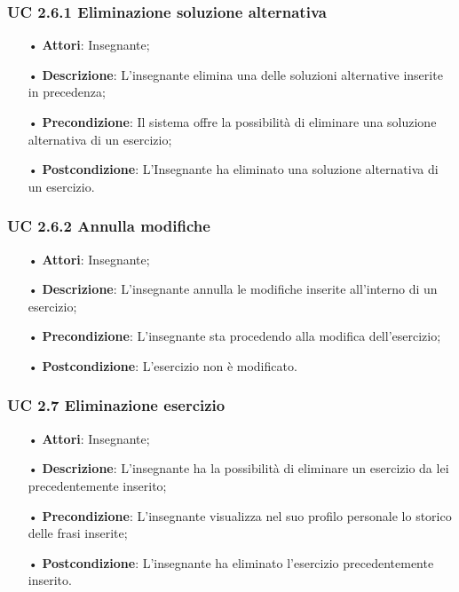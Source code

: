 \subsubsection{UC 2.6.1 Eliminazione soluzione alternativa}
\begin{itemize}
	\item[•] \textbf{Attori}: Insegnante;
	\item[•] \textbf{Descrizione}: L'insegnante elimina una delle soluzioni alternative inserite in precedenza;
	\item[•] \textbf{Precondizione}: Il sistema offre la possibilità di eliminare una soluzione alternativa di un esercizio;
	\item[•] \textbf{Postcondizione}: L'Insegnante ha eliminato una soluzione alternativa di un esercizio.
\end{itemize}

\subsubsection{UC 2.6.2 Annulla modifiche}
\begin{itemize}
	\item[•] \textbf{Attori}: Insegnante;
	\item[•] \textbf{Descrizione}: L'insegnante annulla le modifiche inserite all'interno di un esercizio; 
	\item[•] \textbf{Precondizione}: L'insegnante sta procedendo alla modifica dell'esercizio;
	\item[•] \textbf{Postcondizione}: L'esercizio non è modificato.
\end{itemize}


 
\subsubsection{UC 2.7 Eliminazione esercizio}
\begin{itemize}
	\item[•] \textbf{Attori}: Insegnante;
	\item[•] \textbf{Descrizione}: L'insegnante ha la possibilità di eliminare un esercizio da lei precedentemente inserito;
	\item[•] \textbf{Precondizione}: L'insegnante visualizza nel suo profilo personale lo storico delle frasi inserite;
	\item[•] \textbf{Postcondizione}: L'insegnante ha eliminato l'esercizio precedentemente inserito.
\end{itemize}